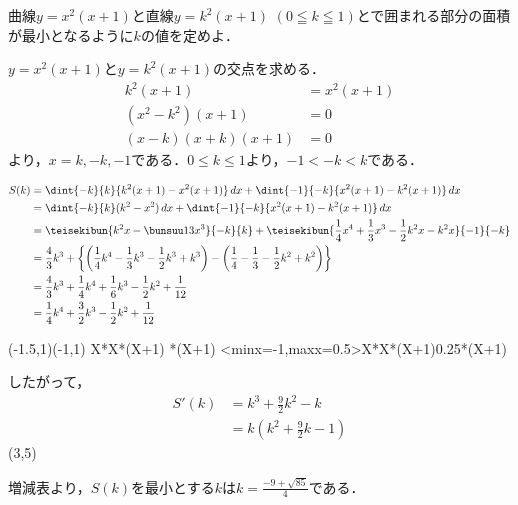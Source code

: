 \begin{problem}
曲線$y=x^2(x+1)$と直線$y=k^2(x+1)$ $(0 \leqq k \leqq 1)$とで囲まれる部分の面積が最小となるように$k$の値を定めよ．
\end{problem}

$y = x^2(x+1)$と$y=k^2(x+1)$の交点を求める．
\begin{align*}
  k^2(x+1) &= x^2(x+1) \\
  (x^2-k^2)(x+1) &= 0 \\
  (x-k)(x+k)(x+1) &= 0
\end{align*}
より，$x= k, -k, -1$である．$0 \leq k \leq 1$より，$-1 < -k < k$である．

\begin{align*}
  S(k) &= \dint{-k}{k}\{k^2(x+1)-x^2(x+1)\}\,dx + \dint{-1}{-k}\{x^2(x+1)-k^2(x+1)\}\,dx \\
  &= \dint{-k}{k}(k^2-x^2)\,dx + \dint{-1}{-k}\{x^2(x+1)-k^2(x+1)\}\,dx \\
  &= \teisekibun{k^2x-\bunsuu13x^3}{-k}{k} + \teisekibun{\frac14x^4+\frac13x^3-\frac12k^2x-k^2x}{-1}{-k} \\
  &= \frac43k^3 +
  \left\{\left(\frac14k^4-\frac13k^3-\frac12k^3+k^3\right) - \left(\frac14-\frac13-\frac12k^2+k^2\right)\right\} \\
  &= \frac43k^3+\frac14k^4+\frac16k^3-\frac12k^2+\frac1{12} \\
  &= \frac14k^4+\frac32k^3-\frac12k^2+\frac1{12}
\end{align*}

\begin{mawarikomi}{}{%
\begin{pszahyou}[ul=25mm](-1.5,1)(-1,1)
  \def\Fx{X*X*(X+1)}
  \def\Gx{0.25*(X+1)}
  \YGraph\Fx
  \YGraph\Gx
  \YPaintii<minx=-1,maxx=0.5>\Fx\Gx
\end{pszahyou}
}
したがって，
\begin{align*}
  S'(k) &= k^3+\frac92k^2-k \\
  &= k\left(k^2+\frac92k-1\right)
\end{align*}
\RESETKEYA
{}
\zogen(3,5)

増減表より，$S(k)$を最小とする$k$は$k = \frac{-9+\sqrt{85}}{4}$である．
\end{mawarikomi}

